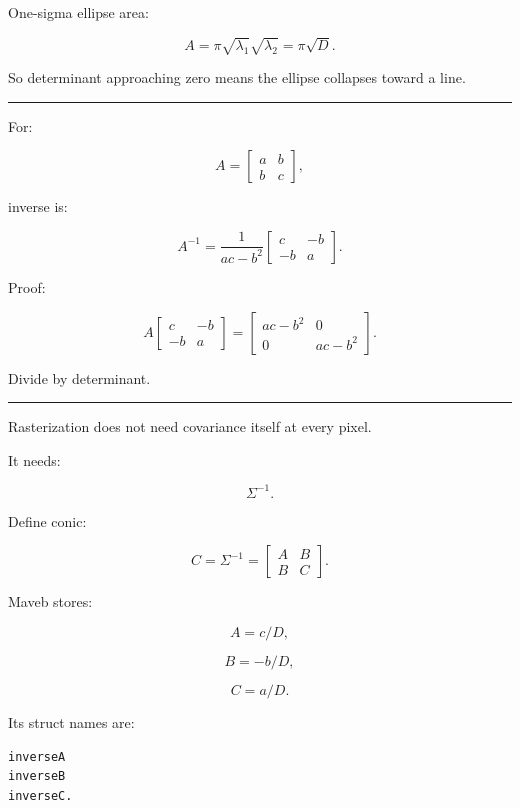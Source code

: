 One-sigma ellipse area:

\[
A=
\pi
\sqrt{\lambda_1}
\sqrt{\lambda_2}
=
\boxed{
\pi\sqrt{D}.
}
\]

So determinant approaching zero means the ellipse collapses toward a line.

\begin{center}\rule{0.5\linewidth}{0.5pt}\end{center}

For:

\[
A=
\begin{bmatrix}
a&b\\
b&c
\end{bmatrix},
\]

inverse is:

\[
\boxed{
A^{-1}
=
\frac1{ac-b^2}
\begin{bmatrix}
c&-b\\
-b&a
\end{bmatrix}.
}
\]

Proof:

\[
A
\begin{bmatrix}
c&-b\\
-b&a
\end{bmatrix}
=
\begin{bmatrix}
ac-b^2&0\\
0&ac-b^2
\end{bmatrix}.
\]

Divide by determinant.

\begin{center}\rule{0.5\linewidth}{0.5pt}\end{center}

Rasterization does not need covariance itself at every pixel.

It needs:

\[
\Sigma^{-1}.
\]

Define conic:

\[
C=
\Sigma^{-1}
=
\begin{bmatrix}
A&B\\
B&C
\end{bmatrix}.
\]

Maveb stores:

\[
A=
c/D,
\]

\[
B=
-b/D,
\]

\[
C=
a/D.
\]

Its struct names are:

\protect{}\label{cgxb8q}%
\begin{verbatim}
inverseA
inverseB
inverseC.
\end{verbatim}

